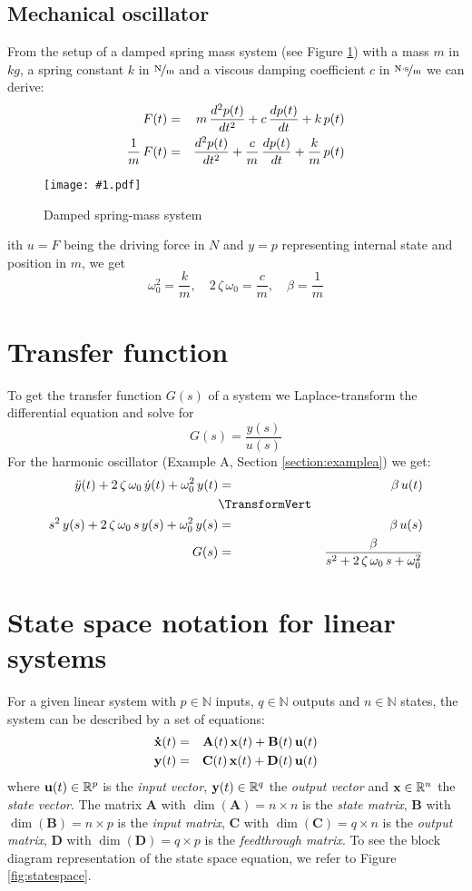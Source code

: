 \documentclass[a4paper,12pt]{article}
\newcommand{\Fig}[4]{%
\begin{figure}[htb]%
\begin{center}%
\texttt{[image: \#1.pdf]}%
\end{center}%
\caption{#3\label{fig:#1}}%
\end{figure}%
}
\newcommand{\FigRef}[1]{Figure \ref{fig:#1}}
\renewcommand{\Vec}[1]{{\bf #1}}
\newcommand{\Mat}[1]{\mathbf{#1}}
\newcommand{\pfrac}[2]{\frac{#1}{#2}}
\newcommand{\Section}[2]{\section{#2}\label{section:#1}}
\newcommand{\SRef}[1]{Section \ref{section:#1}}
\newcommand{\SubSection}[2]{\subsection{#2}\label{subsection:#1}}
\begin{document}
\SubSection{exampleamech}{Mechanical oscillator}

From the setup of a damped spring mass system (see \FigRef{mechoscil}) with a mass $m$ in $\unit{kg}$, a spring constant $k$ in $\unitfrac{N}{m}$ and a viscous damping coefficient $c$ in $\unitfrac{N\cdot s}{m}$ we can derive:
\begin{eqnarray}
F(t)&=&m\,{{d^2p(t)}\over{dt^2}}+c\,{{dp(t)}\over{dt}}+k\,p(t)\\
{1\over{m}}\,F(t)&=&{{d^2p(t)}\over{dt^2}}+{c\over{m}}\,{{dp(t)}\over{dt}}+{k\over{m}}\,p(t)\\
\end{eqnarray}

\Fig{mechoscil}{0.5}{Damped spring-mass system}

With $u=F$ being the driving force in $\unit{N}$ and $y=p$ representing internal state and position in $\unit{m}$, we get
\begin{equation}
\omega_0^2=\pfrac{k}{m},\quad2\,\zeta\,\omega_0=\pfrac{c}{m},\quad\beta=\pfrac{1}{m}
\end{equation}

\Section{xferfun}{Transfer function}

To get the transfer function $G(s)$ of a system we Laplace-transform the differential equation and solve for 
\begin{equation}
G(s)=\frac{y(s)}{u(s)}
\end{equation}
For the harmonic oscillator (Example A, \SRef{examplea}) we get:
\begin{eqnarray}
\ddot{y}(t)+2\,\zeta\,\omega_0\,\dot{y}(t)+\omega_0^2\,y(t)&=&\beta\,u(t)\\
&\TransformVert&\nonumber\\
s^2\,y(s)+2\,\zeta\,\omega_0\,s\,y(s)+\omega_0^2\,y(s)&=&\beta\,u(s)\\
G(s)&=&\frac{\beta}{s^2+2\,\zeta\,\omega_0\,s+\omega_0^2}
\end{eqnarray}

\Section{lsystem}{State space notation for linear systems}

For a given linear system with $p\in\mathbb{N}$ inputs, $q\in\mathbb{N}$ outputs and $n\in\mathbb{N}$ states, the system can be described by a set of equations:
\begin{eqnarray}
\Vec{\dot{x}}(t)&=&\Mat{A}(t)\,\Vec{x}(t)+\Mat{B}(t)\,\Vec{u}(t)\\
\Vec{y}(t)&=&\Mat{C}(t)\,\Vec{x}(t)+\Mat{D}(t)\,\Vec{u}(t)
\end{eqnarray}
where $\Vec{u}(t)\in\mathbb{R}^p$ is the {\em input vector}, $\Vec{y}(t)\in\mathbb{R}^q$ the {\em output vector} and $\Vec{x}\in\mathbb{R}^n$ the {\em state vector}. The matrix $\Mat{A}$ with $\dim(\Mat{A})=n\times n$ is the {\em state matrix}, $\Mat{B}$ with $\dim(\Mat{B})=n\times p$ is the {\em input matrix}, $\Mat{C}$ with $\dim(\Mat{C})=q\times n$ is the {\em output matrix}, $\Mat{D}$ with $\dim(\Mat{D})=q\times p$ is the {\em feedthrough matrix}. To see the block diagram representation of the state space equation, we refer to \FigRef{statespace}.\\
\end{document}

